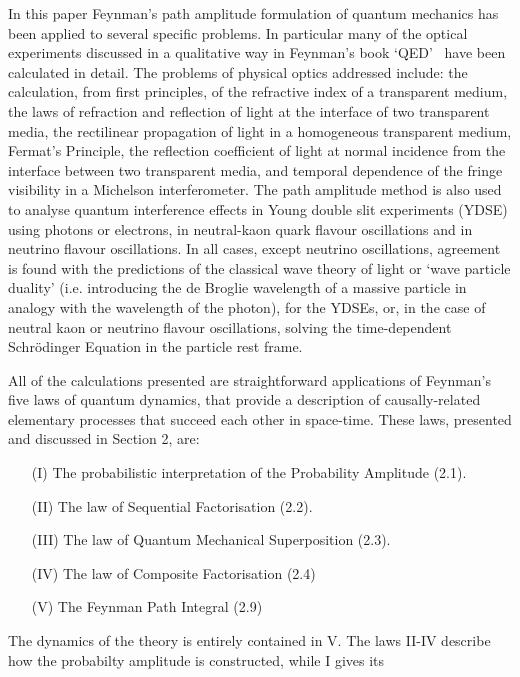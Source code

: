 \documentclass [12pt]{article}
\newcommand{\BS}{\bigskip}
\newcommand{\SECTION}[1]{\BS{\large\section{\bf #1}}}
\begin{document}
{ \SECTION{\bf{Summary and Outlook}}
  In this paper Feynman's path amplitude formulation of quantum mechanics has been applied to several
  specific problems. In particular many of the optical experiments discussed in a qualitative way in
  Feynman's book `QED'~\cite{Feyn1} have been calculated in detail. The problems of physical optics
  addressed include: the calculation, from first principles, of the refractive index of a 
  transparent medium, the laws of refraction and reflection of light at the interface of two transparent 
  media, the rectilinear propagation of light in a homogeneous transparent medium, Fermat's
    Principle, the reflection
   coefficient of light at normal incidence from the interface between two transparent media,
   and temporal dependence of the fringe visibility in a Michelson interferometer. The path amplitude
  method is also used to analyse quantum interference effects in Young double slit experiments (YDSE)
  using photons or electrons, in neutral-kaon quark flavour oscillations and in neutrino
  flavour oscillations. In all cases, except neutrino oscillations, agreement is found
  with the predictions of the classical wave theory of light or `wave particle duality' 
 (i.e. introducing the de Broglie wavelength of a massive particle in analogy with 
  the wavelength of the photon), for the YDSEs, or, 
   in the case of neutral kaon or neutrino flavour oscillations, solving the 
   time-dependent Schr\"{o}dinger Equation in the particle rest frame.
   \par All of the calculations presented are straightforward applications
   of Feynman's five laws of quantum dynamics, that provide a description
   of causally-related elementary processes that succeed each other in space-time. These laws, 
  presented and discussed in Section 2, are:
  \begin{itemize}
   \item[(I)] The probabilistic interpretation of the Probability Amplitude (2.1).
  \item[(II)] The law of Sequential Factorisation (2.2).
  \item[(III)] The law of Quantum Mechanical Superposition (2.3). 
  \item[(IV)] The law of Composite Factorisation (2.4)
  \item[(V)] The Feynman Path Integral (2.9)
  \end{itemize}
  The dynamics of the theory is entirely contained in V. The laws II-IV 
  describe how the probabilty amplitude is constructed, while I gives its
}
\end{document}

